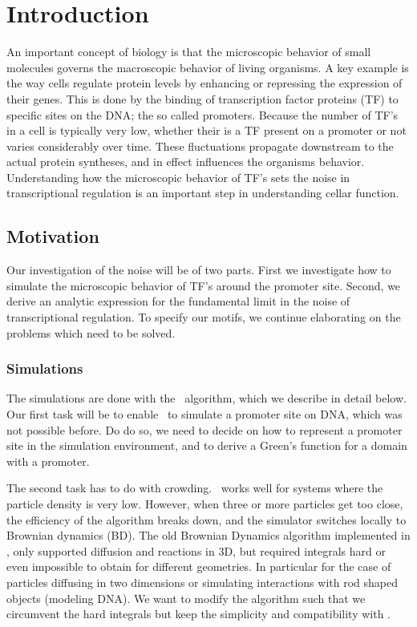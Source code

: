 \section{Introduction}

An important concept of biology is that the microscopic behavior of small molecules governs the macroscopic behavior of living organisms. A key example is the way cells regulate protein levels by enhancing or repressing the expression of their genes. This is done by the binding of transcription factor proteins (TF) to specific sites on the DNA; the so called promoters. Because the number of TF's in a cell is typically very low, whether their is a TF present on a promoter or not varies considerably over time. These fluctuations propagate downstream to the actual protein syntheses, and in effect influences the organisms behavior. Understanding how the microscopic behavior of TF's sets the noise in transcriptional regulation is an important step in understanding cellar function.

\subsection{Motivation}
Our investigation of the noise will be of two parts. First we investigate how to simulate the microscopic behavior of TF's around the promoter site. Second, we derive an analytic expression for the fundamental limit in the noise of transcriptional regulation. To specify our motifs, we continue elaborating on the problems which need to be solved.

\subsubsection{Simulations}
The simulations are done with the \GFRD\, algorithm, which we describe in detail below. Our first task will be to enable \GFRD\, to simulate a promoter site on DNA, which was not possible before. Do do so, we need to decide on how to represent a promoter site in the simulation environment, and to derive a Green's function for a domain with a promoter. 

The second task has to do with crowding. \GFRD\, works well for systems where the particle density is very low. However, when three or more particles get too close, the efficiency of the algorithm breaks down, and the simulator switches locally to Brownian dynamics (BD). The old Brownian Dynamics algorithm implemented in \GFRD \cite{Morelli2008a}, only supported diffusion and reactions in 3D, but required integrals hard or even impossible to obtain for different geometries. In particular for the case of particles diffusing in two dimensions or simulating interactions with rod shaped objects (modeling DNA). We want to modify the algorithm such that we circumvent the hard integrals but keep the simplicity and compatibility with \GFRD.

